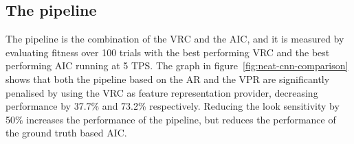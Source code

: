 

\subsection{The pipeline}
\label{sec:pipeline-results}

The pipeline is the combination of the VRC and the AIC, and it is measured by evaluating fitness over 100 trials with the best performing VRC and the best performing AIC running at 5 TPS. The graph in figure~\ref{fig:neat-cnn-comparison} shows that both the pipeline based on the AR and the VPR are significantly penalised by using the VRC as feature representation provider, decreasing performance by 37.7\% and 73.2\% respectively. Reducing the look sensitivity by 50\% increases the performance of the pipeline, but reduces the performance of the ground truth based AIC.





























































